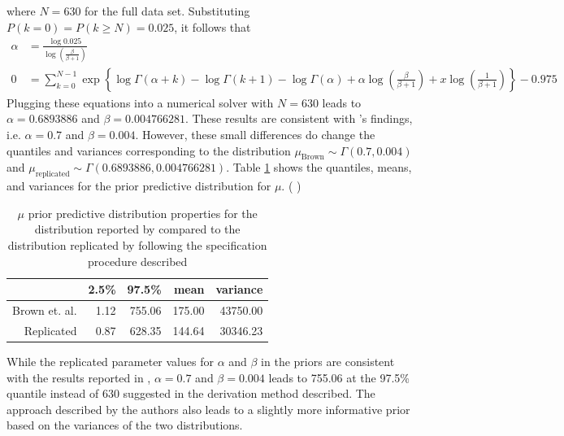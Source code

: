 \documentclass{uwstat572}
\newcommand{\vmcomment}[1]{({\color{blue}{VM's comment:}} \textbf{\color{blue}{#1}})}
\begin{document}
where $N=630$ for the full data set. 
Substituting $P(k=0)=P(k \ge N)=0.025$, it follows that 
\begin{align*}
\alpha &= \frac{\log 0.025}{\log \left( \frac{\beta}{\beta+1} \right)} \\
0 &= \sum_{k=0}^{N-1} \exp \left\{ \log \Gamma(\alpha+k) - \log \Gamma(k+1) - \log \Gamma(\alpha) + \alpha \log \left(\frac{\beta}{\beta +1} \right) + x \log \left(\frac{1}{\beta +1} \right) \right\} - 0.975
\end{align*}
Plugging these equations into a numerical solver with $N=630$ leads to $\alpha=0.6893886$ and $\beta=0.004766281$. 
These results are consistent with \citet{Brown}'s findings, i.e. $\alpha=0.7$ and $\beta=0.004$. 
However, these small differences do change the quantiles and variances corresponding to the distribution $\mu_{\text{Brown}} \sim \Gamma(0.7, 0.004)$ and $\mu_{\text{replicated}} \sim \Gamma(0.6893886, 0.004766281)$. 
Table \ref{table:mu_prior_quantile} shows the quantiles, means, and variances for the prior predictive distribution for $\mu$. 
\vmcomment{I would skip or move the above equations into the appendix. Poisson integrated against Gamma results in a Negative Binomial distribution, which is pretty standard. I would not dwell on this in the manuscript.}

\begin{table}[ht]
\centering
\begin{tabular}{rrrrr}
  \hline
 & 2.5\% & 97.5\% & mean & variance \\ 
  \hline
Brown et. al. & 1.12 & 755.06 & 175.00 & 43750.00 \\ 
  Replicated & 0.87 & 628.35 & 144.64 & 30346.23 \\ 
   \hline
\end{tabular}
\caption{$\mu$ prior predictive distribution properties for the distribution reported by \cite{Brown} compared to the distribution replicated by following the specification procedure described}
\label{table:mu_prior_quantile}
\end{table}

While the replicated parameter values for $\alpha$ and $\beta$ in the priors are consistent with the results reported in \citep{Brown}, $\alpha=0.7$ and $\beta=0.004$ leads to 755.06 at the 97.5\% quantile instead of 630 suggested in the derivation method described. 
The approach described by the authors also leads to a slightly more informative prior based on the variances of the two distributions. 
\end{document}
